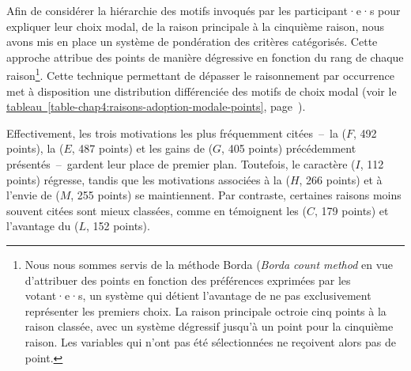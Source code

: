 \begin{refsegment}
Afin de considérer la hiérarchie des motifs invoqués par les participant·e·s pour expliquer leur choix modal, de la raison principale à la cinquième raison, nous avons mis en place un système de pondération des critères catégorisés. Cette approche attribue des points de manière dégressive en fonction du rang de chaque raison\footnote{
    Nous nous sommes servis de la méthode Borda (\textsl{Borda count method} en vue d'attribuer des points en fonction des préférences exprimées par les votant·e·s, un système qui détient l'avantage de ne pas exclusivement représenter les premiers choix. La raison principale octroie cinq points à la raison classée, avec un système dégressif jusqu'à un point pour la cinquième raison. Les variables qui n'ont pas été sélectionnées ne reçoivent alors pas de point.
}. Cette technique permettant de dépasser le raisonnement par occurrence met à disposition une distribution différenciée des motifs de choix modal (voir le \hyperref[table-chap4:raisons-adoption-modale-points]{tableau~\ref{table-chap4:raisons-adoption-modale-points}}, page~\pageref{table-chap4:raisons-adoption-modale-points}).%

Effectivement, les trois motivations les plus fréquemment citées~–~la  (\(F\), 492 points), la  (\(E\), 487 points) et les gains de  (\(G\), 405 points) précédemment présentés~–~gardent leur place de premier plan. Toutefois, le caractère  (\(I\), 112 points) régresse, tandis que les motivations associées à la  (\(H\), 266 points) et à l'envie de  (\(M\), 255 points) se maintiennent. Par contraste, certaines raisons moins souvent citées sont mieux classées, comme en témoignent les  (\(C\), 179 points) et l'avantage du  (\(L\), 152 points).%



\end{refsegment}
